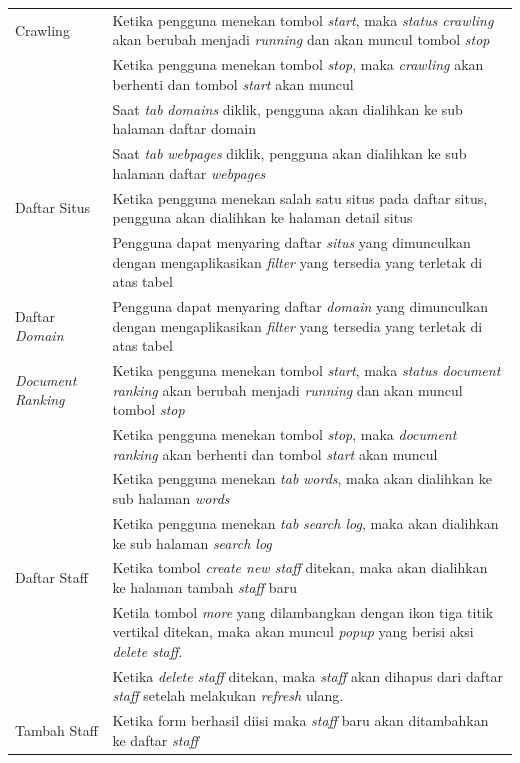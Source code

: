 \begin{enumerate}[leftmargin=1\parindent]
\begin{longtable}{@{}|p{4cm}|p{8cm}|@{}}
		\hline
		Crawling & Ketika pengguna menekan tombol \textit{start}, maka \textit{status crawling} akan berubah menjadi \textit{running} dan akan muncul tombol \textit{stop} \\
		\cline{2-2}
		& Ketika pengguna menekan tombol \textit{stop}, maka \textit{crawling} akan berhenti dan tombol \textit{start} akan muncul \\
		\cline{2-2}
		& Saat \textit{tab} \textit{domains} diklik, pengguna akan dialihkan ke sub halaman daftar domain \\
		\cline{2-2}
		& Saat \textit{tab} \textit{webpages} diklik, pengguna akan dialihkan ke sub halaman daftar \textit{webpages} \\
		\hline
		Daftar Situs & Ketika pengguna menekan salah satu situs pada daftar situs, pengguna akan dialihkan ke halaman detail situs \\
		\cline{2-2}
		& Pengguna dapat menyaring daftar \textit{situs} yang dimunculkan dengan mengaplikasikan \textit{filter} yang tersedia yang terletak di atas tabel \\
		\hline
		Daftar \textit{Domain} & Pengguna dapat menyaring daftar \textit{domain} yang dimunculkan dengan mengaplikasikan \textit{filter} yang tersedia yang terletak di atas tabel \\
		\hline
		\textit{Document Ranking} & Ketika pengguna menekan tombol \textit{start}, maka \textit{status document ranking} akan berubah menjadi \textit{running} dan akan muncul tombol \textit{stop} \\
		\cline{2-2}
		& Ketika pengguna menekan tombol \textit{stop}, maka \textit{document ranking} akan berhenti dan tombol \textit{start} akan muncul \\
		\cline{2-2}
		\hline
		\hline
		& Ketika pengguna menekan \textit{tab} \textit{words}, maka akan dialihkan ke sub halaman \textit{words} \\
		\cline{2-2}		

		& Ketika pengguna menekan \textit{tab} \textit{search log}, maka akan dialihkan ke sub halaman \textit{search log} \\
		\hline
		Daftar Staff & Ketika tombol \textit{create new staff} ditekan, maka akan dialihkan ke halaman tambah \textit{staff} baru \\
		\cline{2-2}
		&  Ketila tombol \textit{more} yang dilambangkan dengan ikon tiga titik vertikal ditekan, maka akan muncul \textit{popup} yang berisi aksi \textit{delete staff}. \\
		\cline{2-2}
		& Ketika \textit{delete staff} ditekan, maka \textit{staff} akan dihapus dari daftar \textit{staff} setelah melakukan \textit{refresh} ulang. \\
		\hline
		Tambah Staff & Ketika form berhasil diisi maka \textit{staff} baru akan ditambahkan ke daftar \textit{staff} \\
		\hline
	\end{longtable}


\end{enumerate}
